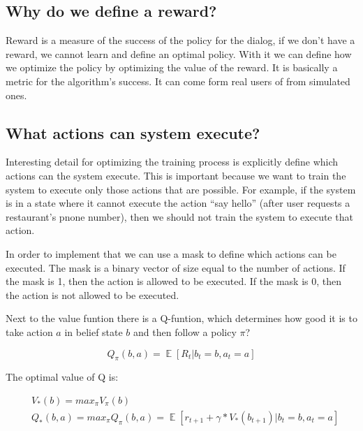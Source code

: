 \documentclass[12pt,titlepage,a4paper]{article}
\DeclareMathOperator*{\E}{\mathbb{E}}
\begin{document}
\subsection{Why do we define a reward?}

Reward is a measure of the success of the policy for the dialog, if we don’t have a reward, we cannot learn and define an optimal policy. With it we can define how we optimize the policy by optimizing the value of the reward. It is basically a metric for the algorithm's success. It can come form real users of from simulated ones.

\subsection{What actions can system execute?}

Interesting detail for optimizing the training process is explicitly define which actions can the system execute. This is important because we want to train the system to execute only those actions that are possible. For example, if the system is in a state where it cannot execute the action “say hello” (after user requests a restaurant's pnone number), then we should not train the system to execute that action. 

In order to implement that we can use a mask to define which actions can be executed. The mask is a binary vector of size equal to the number of actions. If the mask is 1, then the action is allowed to be executed. If the mask is 0, then the action is not allowed to be executed.

\par
Next to the value funtion there is a Q-funtion, which determines how good it is to take action $a$ in belief state $b$ and then follow a policy $\pi$?

\begin{center}
    \begin{equation}
        Q_{\pi}(b, a) = \E[R_t| b_t = b, a_t = a]
    \end{equation}
\end{center}

The optimal value of Q is:
\begin{center}
    \begin{align}
        &V_{*}(b) = max_{\pi}V_{\pi}(b) \\
        &Q_{*}(b, a) = max_{\pi}Q_{\pi}(b, a) = \E[r_{t+1} + \gamma * V_{*}(b_{t+1})| b_t = b, a_t = a] \\
    \end{align}
\end{center}
\end{document}

